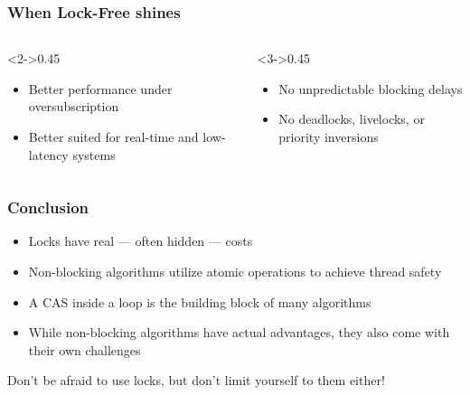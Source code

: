 \documentclass[aspectratio=169,listings,handout]{beamer}
\begin{document}
\begin{frame}
	\frametitle{When Lock-Free shines}
	\begin{columns}[c]
		\begin{column}<2->{0.45\textwidth}
			\begin{block}[Performance]
				\begin{itemize}
					\item Better performance under oversubscription
					\item Better suited for real-time and low-latency systems
				\end{itemize}
			\end{block}
		\end{column}
		\begin{column}<3->{0.45\textwidth}
			\begin{block}[Robustness]
				\begin{itemize}
					\item No unpredictable blocking delays
					\item No deadlocks, livelocks, or priority inversions
				\end{itemize}
			\end{block}
		\end{column}
	\end{columns}
\end{frame}

\def\checkbox{\raisebox{-1pt}{\begin{tikzpicture}[baseline=-4.7pt]
	\node[roundednode,fill=black,draw=white,minimum width=2ex,minimum height=2ex] (B) {};
	\node at (B) {\scalebox{.6}{\color{white}\faCheck}};
\end{tikzpicture}}}
\begin{frame}
	\frametitle{Conclusion}
	\begin{itemize}[<+(1)->]\setlength{\itemsep}{6pt}
		\item[\checkbox] Locks have real --- often hidden --- costs
		\item[\checkbox] Non-blocking algorithms utilize atomic operations to achieve
			thread safety
		\item[\checkbox] A CAS inside a loop is the building block of many algorithms
		\item[\checkbox] While non-blocking algorithms have actual advantages, they
			also come with their own challenges
	\end{itemize}\par\bigskip\pause
	\begin{block}\large
		\centerline{Don't be afraid to use locks, but don't limit yourself to them
		either!}
	\end{block}
\end{frame}
\end{document}
